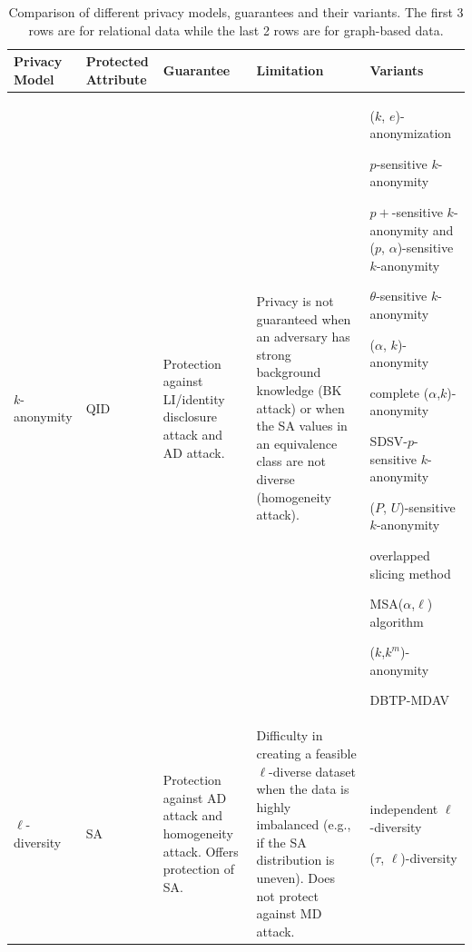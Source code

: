 \documentclass{bioinfo}
\begin{document}
\begin{table}
\begin{center}
\caption{Comparison of different privacy models, guarantees and their variants. The first 3 rows are  for relational data while the last 2 rows are for graph-based data.}
\label{tab:diffanonymization}
\begin{tabular}{p{1.5cm}p{2cm}p{4cm}p{5cm}p{4cm}}
\toprule
Privacy Model & Protected Attribute & Guarantee & Limitation & Variants \\ \toprule
$k$-anonymity & QID & Protection against LI/identity disclosure attack and AD attack. & Privacy is not guaranteed when an adversary has strong background knowledge (BK attack) or when the SA values in an equivalence class are not diverse (homogeneity attack). & ($k$, $e$)-anonymization \cite{zhang2007aggregate} 

$p$-sensitive $k$-anonymity \cite{campan2010p}

$p+$-sensitive $k$-anonymity and ($p$, $\alpha$)-sensitive $k$-anonymity \cite{sun2011extended}

$\theta$-sensitive $k$-anonymity \cite{khan2020theta}

($\alpha$, $k$)-anonymity \cite{wong2006alpha}

complete ($\alpha$,$k$)-anonymity \cite{jian2008complete}

SDSV-$p$-sensitive $k$-anonymity \cite{budiardjo2019approach}

($P$, $U$)-sensitive $k$-anonymity \cite{agarwal2018enhanced}

overlapped slicing method \cite{budiardjo2019privacy}

MSA($\alpha$,$\ell$)  algorithm \cite{zhang2017improved}

($k$,$k^m$)-anonymity \cite{POULIS201776}

DBTP-MDAV \cite{wu2019micro} \\

\midrule

$\ell$-diversity & SA & Protection against AD attack and homogeneity attack. Offers protection of SA. & Difficulty in creating a feasible $\ell$-diverse dataset when the data is highly imbalanced (e.g., if the SA distribution is uneven). Does not protect against MD attack. & independent $\ell$-diversity \cite{zhu2015privacy}

($\tau$, $\ell$)-diversity \cite{tian2011extending}


\end{tabular}
\end{center}
\end{table}
\end{document}
